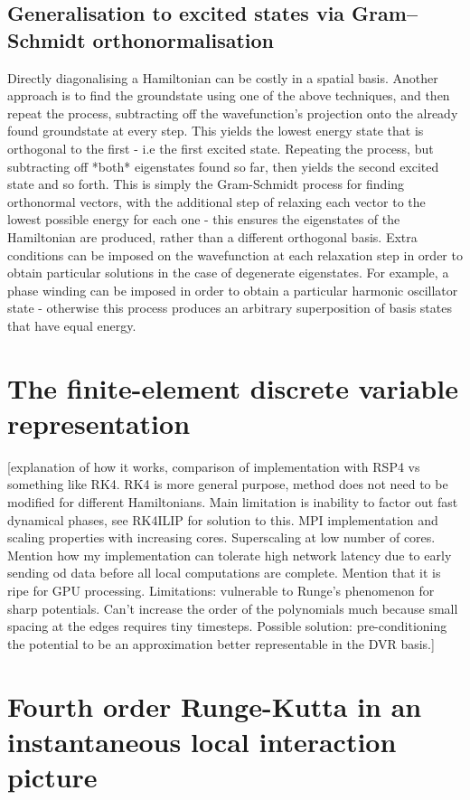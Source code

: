 \subsection{Generalisation to excited states via Gram–Schmidt orthonormalisation}
Directly diagonalising a Hamiltonian can be costly in a spatial basis. Another approach is to find the groundstate using one of the above techniques, and then repeat the process, subtracting off the wavefunction's projection onto the already found groundstate at every step. This yields the lowest energy state that is orthogonal to the first - i.e the first excited state. Repeating the process, but subtracting off *both* eigenstates found so far, then yields the second excited state and so forth. This is simply the Gram-Schmidt process for finding orthonormal vectors, with the additional step of relaxing each vector to the lowest possible energy for each one - this ensures the eigenstates of the Hamiltonian are produced, rather than a different orthogonal basis. Extra conditions can be imposed on the wavefunction at each relaxation step in order to obtain particular solutions in the case of degenerate eigenstates. For example, a phase winding can be imposed in order to obtain a particular harmonic oscillator state - otherwise this process produces an arbitrary superposition of basis states that have equal energy.

\section{The finite-element discrete variable representation}

[explanation of how it works, comparison of implementation with RSP4 vs something like RK4. RK4 is more general purpose, method does not need to be modified for different Hamiltonians. Main limitation is inability to factor out fast dynamical phases, see RK4ILIP for solution to this. MPI implementation and scaling properties with increasing cores. Superscaling at low number of cores. Mention how my implementation can tolerate high network latency due to early sending od data before all local computations are complete. Mention that it is ripe for GPU processing. Limitations: vulnerable to Runge's phenomenon for sharp potentials. Can't increase the order of the polynomials much because small spacing at the edges requires tiny timesteps. Possible solution: pre-conditioning the potential to be an approximation better representable in the DVR basis.]


\section{Fourth order Runge-Kutta in an instantaneous local interaction picture}

